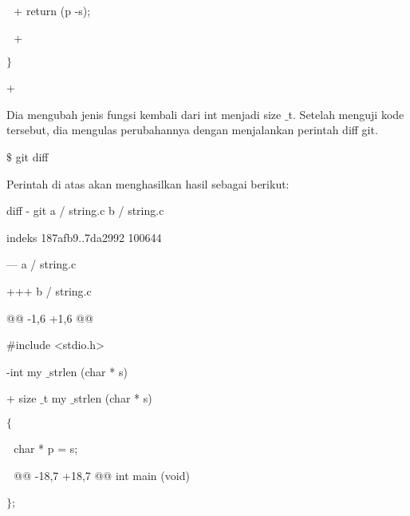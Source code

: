 \noindent 
 \hspace*{0.5in}  $  $ $  $ $  $+ return (p -s); \par
\noindent 
 \hspace*{0.5in}  $  $ $  $ $  $+ \par
\noindent 
 \hspace*{0.5in}  $  \}  $ \par
\noindent 
 \hspace*{0.5in} + \par
\noindent 
Dia mengubah jenis fungsi kembali dari int menjadi size $  \_  $t. Setelah menguji kode tersebut, dia mengulas perubahannya dengan menjalankan perintah diff git. \par
\noindent 
 \hspace*{0.5in}  $  \$  $ git diff \par
\noindent 
Perintah di atas akan menghasilkan hasil sebagai berikut: \par
\noindent 
 \hspace*{0.5in} diff - git a / string.c b / string.c \par
\noindent 
 \hspace*{0.5in} indeks 187afb9..7da2992 100644 \par
\noindent 
 \hspace*{0.5in} --- a / string.c \par
\noindent 
 \hspace*{0.5in} +++ b / string.c \par
\noindent 
 \hspace*{0.5in} @@ -1,6 +1,6 @@ \par
\noindent 
 \hspace*{0.5in}  $  \#  $include <stdio.h> \par
\noindent 
 \hspace*{0.5in} -int my $  \_  $strlen (char * s) \par
\noindent 
 \hspace*{0.5in} + size $  \_  $t my $  \_  $strlen (char * s) \par
\noindent 
 \hspace*{0.5in}  $  \{  $ \par
\noindent 
 \hspace*{0.5in}  $  $ $  $ $  $char * p = s; \par
\noindent 
 \hspace*{0.5in}  $  $ $  $ $  $@@ -18,7 +18,7 @@ int main (void) \par
\noindent 
 \hspace*{0.5in}  $  \}  $; \par
